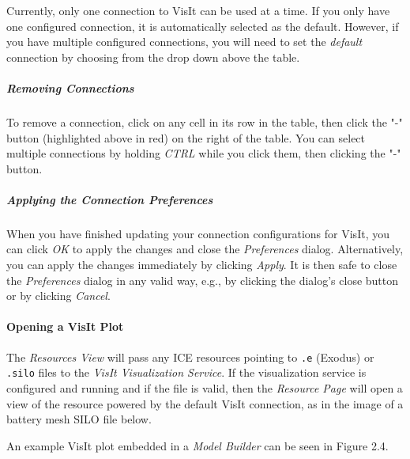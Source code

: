 Currently, only one connection to VisIt can be used at a time. If you
only have one configured connection, it is automatically selected as the
default. However, if you have multiple configured connections, you will
need to set the \emph{default} connection by choosing from the drop down
above the table.

\subparagraph{Removing Connections}\label{removing-connections}

To remove a connection, click on any cell in its row in the table, then
click the "-" button (highlighted above in red) on the right of the
table. You can select multiple connections by holding \emph{CTRL} while
you click them, then clicking the "-" button.

\subparagraph{Applying the Connection
Preferences}\label{applying-the-connection-preferences}

When you have finished updating your connection configurations for
VisIt, you can click \emph{OK} to apply the changes and close the
\emph{Preferences} dialog. Alternatively, you can apply the changes
immediately by clicking \emph{Apply}. It is then safe to close the
\emph{Preferences} dialog in any valid way, e.g., by clicking the
dialog's close button or by clicking \emph{Cancel}.

\paragraph{Opening a VisIt Plot}\label{opening-a-visit-plot}

The \emph{Resources View} will pass any ICE resources pointing to
\texttt{.e} (Exodus) or \texttt{.silo} files to the \emph{VisIt
Visualization Service}. If the visualization service is configured and
running and if the file is valid, then the \emph{Resource Page} will
open a view of the resource powered by the default VisIt connection, as
in the image of a battery mesh SILO file below.

An example VisIt plot embedded in a \emph{Model Builder} can be seen in Figure 2.4.

